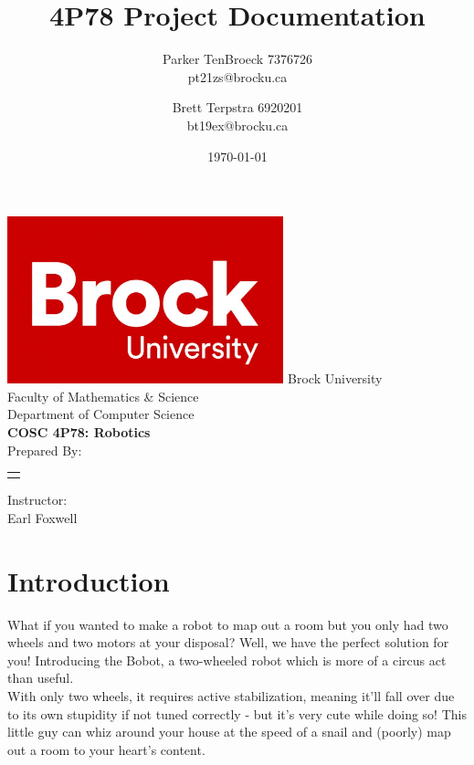 \documentclass[12pt]{article}
\begin{document}
\title{4P78 Project Documentation}
\author{
    Parker TenBroeck 7376726\\
    pt21zs@brocku.ca
    \and
    Brett Terpstra 6920201\\
    bt19ex@brocku.ca
}
\date{\today}

\makeatletter
\begin{titlepage}
	\def \LOGOPATH {brock.jpg}
	\def \UNIVERSITY {Brock University}
	\def \FACULTY {Faculty of Mathematics \& Science}
	\def \DEPARTMENT {Department of Computer Science}
	\def \COURSETITLE {COSC 4P78: Robotics}
	\def \SUPERVISOR {Earl Foxwell}
	
	
	\vfill
	\begin{center}
		\includegraphics[width=0.6\textwidth]{brock.jpg}
		\fontsize{14pt}{14pt}\selectfont
		\vfill
		\UNIVERSITY \\
		\FACULTY \\
		\DEPARTMENT \\
		\vfill
		\fontsize{18pt}{18pt}\selectfont
		\textbf{\COURSETITLE} \\[0.5cm]
		\textbf{\@title}
		\vfill
		\fontsize{14pt}{14pt}\selectfont
		Prepared By: \\[0.5cm]
		
		\begin{tabular}[t]{c}
			\@author
		\end{tabular}\par
	
	    \vfill
		Instructor: \\
		\SUPERVISOR
		\vfill
		\@date
	\end{center}
\end{titlepage}
\makeatother

\newpage

\section{Introduction}
What if you wanted to make a robot to map out a room but you only had two wheels and two motors at your disposal? Well, we have the perfect solution for you! Introducing the Bobot, a two-wheeled robot which is more of a circus act than useful. \\
With only two wheels, it requires active stabilization, meaning it'll fall over due to its own stupidity if not tuned correctly - but it’s very cute while doing so! This little guy can whiz around your house at the speed of a snail and (poorly) map out a room to your heart’s content.
\end{document}
